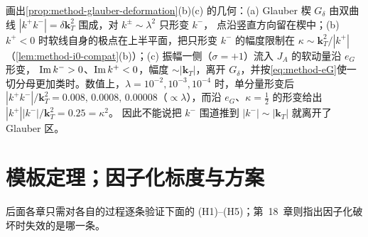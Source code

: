 \begin{remark}[一个分量的形变为何不够]\label{rem:method-two-component}
画出\cref{prop:method-glauber-deformation}(b)(c) 的几何：(a) Glauber 楔 $G_\delta$ 由双曲线 $|k^+k^-|=\delta\mathbf k_T^2$ 围成，对 $k^\pm\sim\lambda^2$ 只形变 $k^-$，
点沿竖直方向留在楔中；(b) $k^+<0$ 时软线自身的极点在上半平面，把只形变 $k^-$ 的幅度限制在 $\kappa\sim\mathbf k_T^2/|k^+|$（\cref{lem:method-i0-compat}(b)）；(c) 振幅一侧（$\sigma=+1$）流入 $J_A$ 的软动量沿 $e_G$ 形变，
$\operatorname{Im} k^->0$、$\operatorname{Im} k^+<0$，幅度 $\sim|\mathbf k_T|$，离开 $G_\delta$，并按\cref{eq:method-eG}使一切分母更加类时。数值上，$\lambda=10^{-2},10^{-3},10^{-4}$ 时，单分量形变后
$|k^+k^-|/\mathbf k_T^2=0.008,\,0.0008,\,0.00008$（$\propto\lambda$），而沿 $e_G$、$\kappa=\frac12$ 的形变给出 $|k^+||k^-|/\mathbf k_T^2=0.25=\kappa^2$。%
因此不能说把 $k^-$ 围道推到 $|k^-|\sim|\mathbf k_T|$ 就离开了 Glauber 区。
\end{remark}

\section{模板定理；因子化标度与方案}\label{sec:method-template}

后面各章只需对各自的过程逐条验证下面的 (H1)--(H5)；第~18~章则指出因子化破坏时失效的是哪一条。

